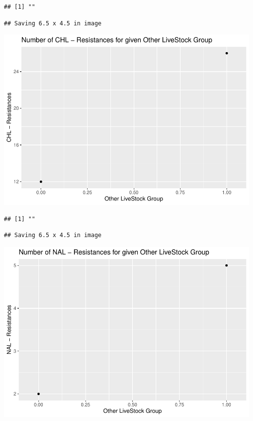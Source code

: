 \documentclass[
]{article}
\begin{document}
\begin{verbatim}
## [1] ""
\end{verbatim}

\begin{verbatim}
## Saving 6.5 x 4.5 in image
\end{verbatim}

\includegraphics{NResistenzen_files/figure-latex/binary_or_nominal_variables-16.pdf}

\begin{verbatim}
## [1] ""
\end{verbatim}

\begin{verbatim}
## Saving 6.5 x 4.5 in image
\end{verbatim}

\includegraphics{NResistenzen_files/figure-latex/binary_or_nominal_variables-17.pdf}
\end{document}
